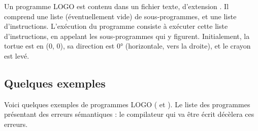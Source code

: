 Un programme LOGO est contenu dans un fichier texte, d'extension . Il comprend une liste (éventuellement vide) de sous-programmes, et une liste d'instructions. L'exécution du programme consiste à exécuter cette liste d'instructions, en appelant les sous-programmes qui y figurent. Initialement, la tortue est en (0, 0), sa direction est 0° (horizontale, vers la droite), et le crayon est levé.


\subsection{Quelques exemples}

Voici quelques exemples de programmes LOGO ( et ). Le  liste des programmes présentant des erreurs sémantiques : le compilateur qui va être écrit décèlera ces erreurs.


